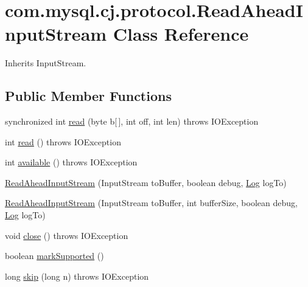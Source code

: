 \hypertarget{classcom_1_1mysql_1_1cj_1_1protocol_1_1_read_ahead_input_stream}{}\section{com.\+mysql.\+cj.\+protocol.\+Read\+Ahead\+Input\+Stream Class Reference}
\label{classcom_1_1mysql_1_1cj_1_1protocol_1_1_read_ahead_input_stream}


Inherits Input\+Stream.

\subsection*{Public Member Functions}
\begin{DoxyCompactItemize}
\item 
synchronized int \mbox{\hyperlink{classcom_1_1mysql_1_1cj_1_1protocol_1_1_read_ahead_input_stream_a130f55bbeb99362583fe11b61a3f792a}{read}} (byte b\mbox{[}$\,$\mbox{]}, int off, int len)  throws I\+O\+Exception 
\item 
int \mbox{\hyperlink{classcom_1_1mysql_1_1cj_1_1protocol_1_1_read_ahead_input_stream_a0810c5860c7fa43ffff24b5d2a5b4f27}{read}} ()  throws I\+O\+Exception 
\item 
int \mbox{\hyperlink{classcom_1_1mysql_1_1cj_1_1protocol_1_1_read_ahead_input_stream_a42da53c32ffa008263b0e68b6a6a8577}{available}} ()  throws I\+O\+Exception 
\item 
\mbox{\hyperlink{classcom_1_1mysql_1_1cj_1_1protocol_1_1_read_ahead_input_stream_ae5435f386001c88ac355cf664961fcbb}{Read\+Ahead\+Input\+Stream}} (Input\+Stream to\+Buffer, boolean debug, \mbox{\hyperlink{interfacecom_1_1mysql_1_1cj_1_1log_1_1_log}{Log}} log\+To)
\item 
\mbox{\hyperlink{classcom_1_1mysql_1_1cj_1_1protocol_1_1_read_ahead_input_stream_a542ea2a1e891f8cfff9b80c83f05b646}{Read\+Ahead\+Input\+Stream}} (Input\+Stream to\+Buffer, int buffer\+Size, boolean debug, \mbox{\hyperlink{interfacecom_1_1mysql_1_1cj_1_1log_1_1_log}{Log}} log\+To)
\item 
void \mbox{\hyperlink{classcom_1_1mysql_1_1cj_1_1protocol_1_1_read_ahead_input_stream_a6837da76b0a9a3272a9b9db88fee4ecd}{close}} ()  throws I\+O\+Exception 
\item 
boolean \mbox{\hyperlink{classcom_1_1mysql_1_1cj_1_1protocol_1_1_read_ahead_input_stream_a13106d328f8dd3c5ce653a18a7efdfd0}{mark\+Supported}} ()
\item 
long \mbox{\hyperlink{classcom_1_1mysql_1_1cj_1_1protocol_1_1_read_ahead_input_stream_aab36ec1a6e8b9795abfd919af07d6e27}{skip}} (long n)  throws I\+O\+Exception 
\end{DoxyCompactItemize}
